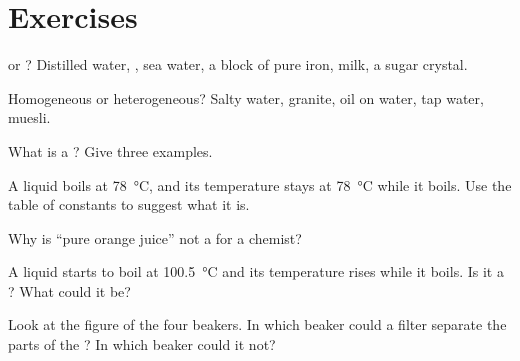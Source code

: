 \section{Exercises}

\begin{exercise}[$\star$]\label{exo:g6:pure-substances-and-mixtures:1}
 or ? Distilled water, , sea water, a block of
pure iron, milk, a sugar crystal.
\end{exercise}

\begin{exercise}[$\star$]\label{exo:g6:pure-substances-and-mixtures:2}
Homogeneous or heterogeneous? Salty water, granite, oil on water, tap
water, muesli.
\end{exercise}

\begin{exercise}[$\star$]\label{exo:g6:pure-substances-and-mixtures:3}
What is a ? Give three examples.
\end{exercise}

\begin{exercise}[$\star$]\label{exo:g6:pure-substances-and-mixtures:4}
A liquid boils at \qty{78}{\celsius}, and its temperature stays at
\qty{78}{\celsius} while it boils. Use the table of constants to suggest
what it is.
\end{exercise}

\begin{exercise}[$\star$]\label{exo:g6:pure-substances-and-mixtures:5}
Why is ``pure orange juice'' not a  for a chemist?
\end{exercise}

\begin{exercise}[$\star\star$]\label{exo:g6:pure-substances-and-mixtures:6}
A liquid starts to boil at \qty{100.5}{\celsius} and its temperature
rises while it boils. Is it a ? What could it be?
\end{exercise}

\begin{exercise}[$\star\star$]\label{exo:g6:pure-substances-and-mixtures:7}
Look at the figure of the four beakers. In which beaker could a filter
separate the parts of the ? In which beaker could it not?
\end{exercise}


